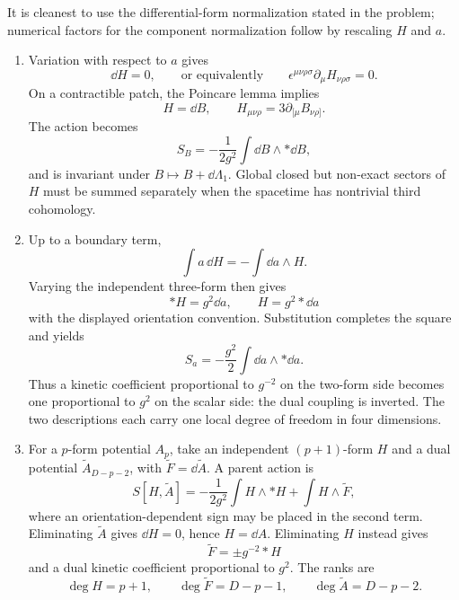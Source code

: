 
\begin{enumerate}
  It is cleanest to use the differential-form normalization stated in the
  problem; numerical factors for the component normalization follow by
  rescaling \(H\) and \(a\).
  \begin{enumerate}
    \item Variation with respect to \(a\) gives
      \[
        \dd H=0,
        \qquad\text{or equivalently}\qquad
        \epsilon^{\mu\nu\rho\sigma}\partial_\mu H_{\nu\rho\sigma}=0.
      \]
      On a contractible patch, the Poincare lemma implies
      \[
        H=\dd B,
        \qquad H_{\mu\nu\rho}=3\partial_{[\mu}B_{\nu\rho]}.
      \]
      The action becomes
      \[
        S_B=-\frac1{2g^2}\int \dd B\wedge *\dd B,
      \]
      and is invariant under \(B\mapsto B+\dd\Lambda_1\).  Global closed
      but non-exact sectors of \(H\) must be summed separately when the
      spacetime has nontrivial third cohomology.

    \item Up to a boundary term,
      \[
        \int a\,\dd H=-\int \dd a\wedge H.
      \]
      Varying the independent three-form then gives
      \[
        *H=g^2 \dd a,
        \qquad H=g^2*\dd a
      \]
      with the displayed orientation convention.  Substitution completes
      the square and yields
      \[
        S_a=-\frac{g^2}{2}\int \dd a\wedge *\dd a.
      \]
      Thus a kinetic coefficient proportional to \(g^{-2}\) on the
      two-form side becomes one proportional to \(g^2\) on the scalar
      side: the dual coupling is inverted.  The two descriptions each
      carry one local degree of freedom in four dimensions.

    \item For a \(p\)-form potential \(A_p\), take an independent
      \((p+1)\)-form \(H\) and a dual potential
      \(\widetilde A_{D-p-2}\), with
      \(\widetilde F=\dd\widetilde A\).  A parent action is
      \[
        S[H,\widetilde A]
          =-\frac1{2g^2}\int H\wedge *H
           +\int H\wedge\widetilde F,
      \]
      where an orientation-dependent sign may be placed in the second
      term.  Eliminating \(\widetilde A\) gives \(\dd H=0\), hence
      \(H=\dd A\).  Eliminating \(H\) instead gives
      \[
        \widetilde F=\pm g^{-2}*H
      \]
      and a dual kinetic coefficient proportional to \(g^2\).  The ranks
      are
      \[
        \deg H=p+1,\qquad
        \deg\widetilde F=D-p-1,\qquad
        \deg\widetilde A=D-p-2.
      \]
  \end{enumerate}


\end{enumerate}
